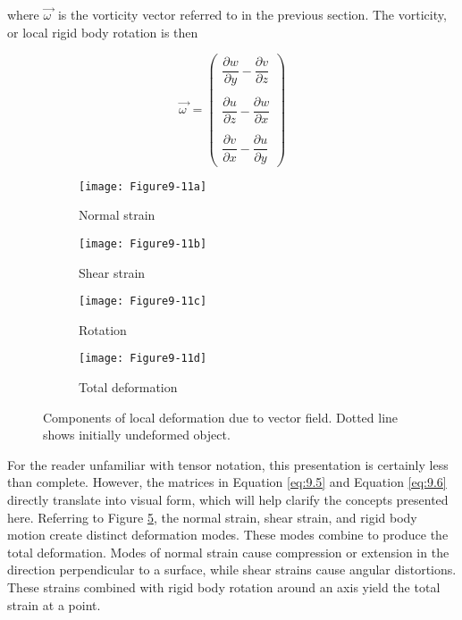 where $\overrightarrow{\omega\ }$ is the vorticity vector referred to in the previous section. The vorticity, or local rigid body rotation is then

\begin{equation}\label{eq:9.8}
\overrightarrow{\omega\ } = \left(
\begin{array}{c}
\dfrac{\partial w}{\partial y} - \dfrac{\partial v}{\partial z} \\ \\
\dfrac{\partial u}{\partial z} - \dfrac{\partial w}{\partial x} \\ \\
\dfrac{\partial v}{\partial x} - \dfrac{\partial u}{\partial y}
\end{array}
\right)
\end{equation}

\begin{figure}[htb]
	\begin{subfigure}[h]{0.48\linewidth}
		\texttt{[image: Figure9-11a]}
		\captionsetup{justification=centering}
		\caption{Normal strain}
		\label{fig:Figure9-11a}
	\end{subfigure}
	\hfill
	\begin{subfigure}[h]{0.48\linewidth}
		\texttt{[image: Figure9-11b]}
		\captionsetup{justification=centering}
		\caption{Shear strain}
		\label{fig:Figure9-11b}
	\end{subfigure}
	\hfill
	\begin{subfigure}[h]{0.48\linewidth}
		\texttt{[image: Figure9-11c]}
		\captionsetup{justification=centering}
		\caption{Rotation}
		\label{fig:Figure9-11c}
	\end{subfigure}
	\hfill
		\begin{subfigure}[h]{0.48\linewidth}
		\texttt{[image: Figure9-11d]}
		\captionsetup{justification=centering}
		\caption{Total deformation}
		\label{fig:Figure9-11d}
	\end{subfigure}
	\caption{Components of local deformation due to vector field. Dotted line shows initially undeformed object.}\label{fig:Figure9-11}
\end{figure}

For the reader unfamiliar with tensor notation, this presentation is certainly less than complete. However, the matrices in Equation \ref{eq:9.5} and Equation \ref{eq:9.6} directly translate into visual form, which will help clarify the concepts presented here. Referring to Figure \ref{fig:Figure9-11}, the normal strain, shear strain, and rigid body motion create distinct deformation modes. These modes combine to produce the total deformation. Modes of normal strain cause compression or extension in the direction perpendicular to a surface, while shear strains cause angular distortions. These strains combined with rigid body rotation around an axis yield the total strain at a point.

